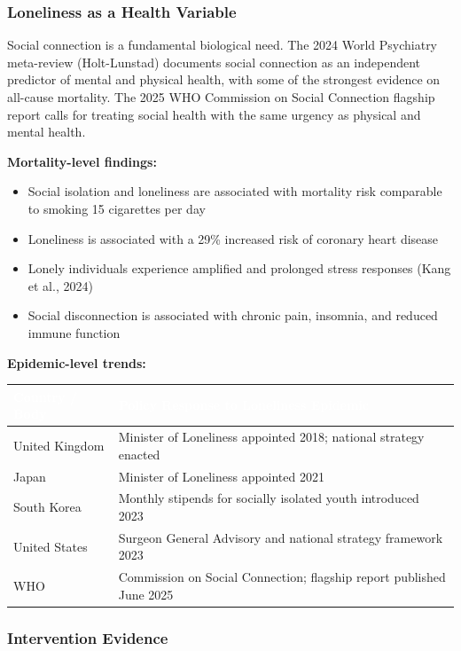 \documentclass[11pt,letterpaper]{article}
\newcommand{\tableheader}[1]{\textbf{\sffamily\textcolor{white}{#1}}}
\begin{document}
\subsubsection{Loneliness as a Health Variable}

Social connection is a fundamental biological need. The 2024 World Psychiatry meta-review (Holt-Lunstad) documents social connection as an independent predictor of mental and physical health, with some of the strongest evidence on all-cause mortality. The 2025 WHO Commission on Social Connection flagship report calls for treating social health with the same urgency as physical and mental health.

\textbf{Mortality-level findings:}
\begin{itemize}[leftmargin=1.5em]
  \item Social isolation and loneliness are associated with mortality risk comparable to smoking 15 cigarettes per day
  \item Loneliness is associated with a 29\% increased risk of coronary heart disease
  \item Lonely individuals experience amplified and prolonged stress responses (Kang et al., 2024)
  \item Social disconnection is associated with chronic pain, insomnia, and reduced immune function
\end{itemize}

\textbf{Epidemic-level trends:}

\begin{center}
\begin{tabularx}{\textwidth}{L{4cm}X}
\toprule
{}
\tableheader{Country / Body} & \tableheader{Policy Response to Loneliness Epidemic} \\
\midrule
United Kingdom & Minister of Loneliness appointed 2018; national strategy enacted \\
Japan & Minister of Loneliness appointed 2021 \\
South Korea & Monthly stipends for socially isolated youth introduced 2023 \\
United States & Surgeon General Advisory and national strategy framework 2023 \\
WHO & Commission on Social Connection; flagship report published June 2025 \\
\bottomrule
\end{tabularx}
\end{center}

\subsubsection{Intervention Evidence}
\end{document}
